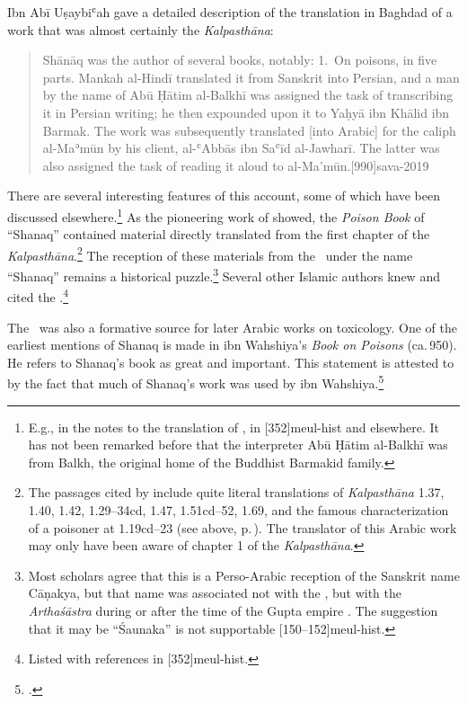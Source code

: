 Ibn Abī Uṣaybiʿah gave a detailed description of the translation in
Baghdad of a work that was almost certainly the \emph{Kalpasthāna}:
\begin{quote}
Shānāq was the author of several books, notably: 1.\ On poisons, in
five parts. Mankah al-Hindī translated it from Sanskrit into Persian,
and a man by the name of Abū Ḥātim al-Balkhī was assigned the task of
transcribing it in Persian writing; he then expounded upon it to Yaḥyā
ibn Khālid ibn Barmak. The work was subsequently translated [into
Arabic] for the caliph al-Maʾmūn by his client, al-ʿAbbās ibn Saʿīd
al-Jawharī. The latter was also assigned the task of reading it aloud
to al-Ma’mūn.[990]{sava-2019}
\end{quote}
There are several interesting features of this account, some of which
have been discussed elsewhere.\footnote{E.g., in the notes to the
    translation of \citeauthor{sava-2019}, in [352]{meul-hist}
    and elsewhere. It has not been remarked before that the interpreter
    Abū Ḥātim al-Balkhī was from Balkh, the original home of the Buddhist
    Barmakid family.}  As the pioneering work of \citeauthor{stra-1934}
    showed, the \emph{Poison Book} of “Shanaq” contained material directly
    translated from the first chapter of the
    \emph{Kalpasthāna}.\footnote{The passages cited by
        \citet[14--19]{stra-1934} include quite literal translations of
        \emph{Kalpasthāna} 1.37, 1.40, 1.42, 1.29--34cd, 1.47, 1.51cd--52,
        1.69, and the famous characterization of a poisoner at 1.19cd--23 (see
        above, p.\,\pageref{poisoner}).  The translator of this Arabic work
        may only have been aware of chapter 1 of the \emph{Kalpasthāna}.} The
        reception of these materials from the \SS\ under the name “Shanaq”
        remains a historical puzzle.\footnote{Most scholars agree that this is
            a Perso-Arabic reception of the Sanskrit name Cāṇakya, but that name
            was associated not with the \SS, but with the \emph{Arthaśāstra}
            during or after the time of the Gupta empire
            \citep[33--36]{oliv-2013}.  The suggestion that it may be “Śaunaka” is
            not supportable [150--152]{meul-hist}.} Several other
            Islamic authors knew and cited the \SS.\footnote{Listed with
                references in [352]{meul-hist}.}
                                
The \SS\ was also a formative source for later Arabic works on
toxicology.  One of the earliest mentions of Shanaq is made in ibn
Wahshiya's \emph{Book on Poisons} (ca.\,950). He refers to Shanaq's
book as great and important. This statement is attested to by the fact
that much of Shanaq's work was used by ibn
Wahshiya.\footcite[6]{leve-1966}
                                
